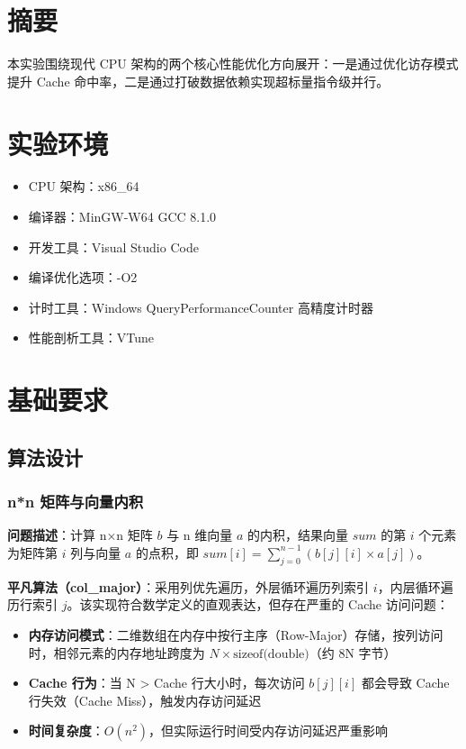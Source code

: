 ﻿\documentclass[9pt,a4paper]{article}
\begin{document}
\section{摘要}
本实验围绕现代 CPU 架构的两个核心性能优化方向展开：一是通过优化访存模式提升 Cache 命中率，二是通过打破数据依赖实现超标量指令级并行。

\section{实验环境}
\begin{itemize}
    \item CPU 架构：x86\_64
    \item 编译器：MinGW-W64 GCC 8.1.0
    \item 开发工具：Visual Studio Code
    \item 编译优化选项：-O2
    \item 计时工具：Windows QueryPerformanceCounter 高精度计时器
    \item 性能剖析工具：VTune
\end{itemize}

\section{基础要求}
\subsection{算法设计}
\subsubsection{n*n 矩阵与向量内积}
\textbf{问题描述}：计算 n×n 矩阵 $b$ 与 n 维向量 $a$ 的内积，结果向量 $sum$ 的第 $i$ 个元素为矩阵第 $i$ 列与向量 $a$ 的点积，即 $sum[i] = \sum_{j=0}^{n-1}(b[j][i] \times a[j])$。

\textbf{平凡算法（col\_major）}：采用列优先遍历，外层循环遍历列索引 $i$，内层循环遍历行索引 $j$。该实现符合数学定义的直观表达，但存在严重的 Cache 访问问题：
\begin{itemize}
    \item \textbf{内存访问模式}：二维数组在内存中按行主序（Row-Major）存储，按列访问时，相邻元素的内存地址跨度为 $N \times \text{sizeof(double)}$（约 8N 字节）
    \item \textbf{Cache 行为}：当 N > Cache 行大小时，每次访问 $b[j][i]$ 都会导致 Cache 行失效（Cache Miss），触发内存访问延迟
    \item \textbf{时间复杂度}：$O(n^2)$，但实际运行时间受内存访问延迟严重影响
\end{itemize}
\end{document}
